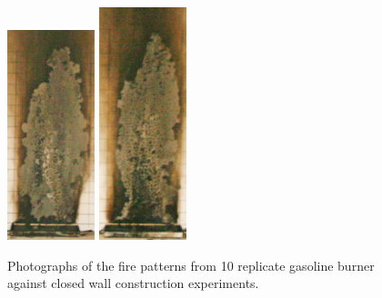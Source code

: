 \documentclass[twoside]{uocthesis}
\begin{document}
{\begin{figure}[p]
	\includegraphics[width=1.0in]{../Figures/GBGAS_12_IMG_5775}
	\includegraphics[width=1.0in]{../Figures/GBGAS_13_IMG_5794} \\

	\caption[Photographs of the fire patterns from 10 replicate gasoline burner against closed wall construction experiments.]{Photographs of the fire patterns from 10 replicate gasoline burner against closed wall construction experiments.}
	\label{Gas_Closed_Wall}
\end{figure}

}
\end{document}
